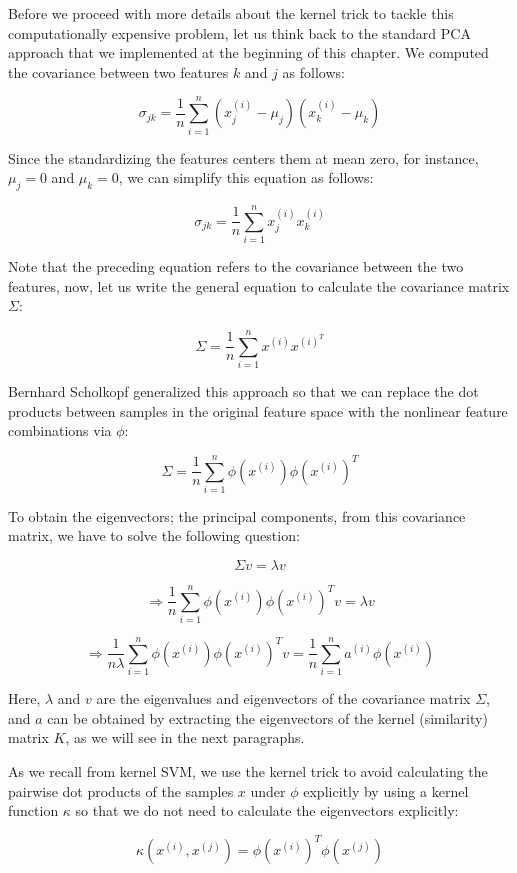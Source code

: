 \documentclass[11pt]{article}
\begin{document}
Before we proceed with more details about the kernel trick to tackle
this computationally expensive problem, let us think back to the
standard PCA approach that we implemented at the beginning of this
chapter. We computed the covariance between two features \(k\) and \(j\)
as follows:

\[\sigma_{jk} = \frac{1}{n} \sum_{i=1}^n \left( x_j^{(i)} - \mu_j \right) \left( x_k^{(i)} - \mu_k \right)\]

Since the standardizing the features centers them at mean zero, for
instance, \(\mu_j = 0\) and \(\mu_k = 0\), we can simplify this equation
as follows:

\[\sigma_{jk} = \frac{1}{n} \sum_{i=1}^n x_j^{(i)} x_k^{(i)}\]

Note that the preceding equation refers to the covariance between the
two features, now, let us write the general equation to calculate the
covariance matrix \(\Sigma\):

\[\Sigma = \frac{1}{n} \sum_{i=1}^n x^{(i)} x^{(i)^T}\]

Bernhard Scholkopf generalized this approach so that we can replace the
dot products between samples in the original feature space with the
nonlinear feature combinations via \(\phi\):

\[\Sigma = \frac{1}{n} \sum_{i=1}^n \phi(x^{(i)}) \phi(x^{(i)})^T\]

To obtain the eigenvectors; the principal components, from this
covariance matrix, we have to solve the following question:

\[\Sigma v = \lambda v\]

\[ \Rightarrow \frac{1}{n} \sum_{i=1}^n \phi(x^{(i)}) \phi(x^{(i)})^T v = \lambda v\]

\[ \Rightarrow \frac{1}{n\lambda} \sum_{i=1}^n \phi(x^{(i)}) \phi(x^{(i)})^T v = \frac{1}{n} \sum_{i=1}^n a^{(i)} \phi(x^{(i)})\]

Here, \(\lambda\) and \(v\) are the eigenvalues and eigenvectors of the
covariance matrix \(\Sigma\), and \(a\) can be obtained by extracting
the eigenvectors of the kernel (similarity) matrix \(K\), as we will see
in the next paragraphs.

As we recall from kernel SVM, we use the kernel trick to avoid
calculating the pairwise dot products of the samples \(x\) under
\(\phi\) explicitly by using a kernel function \(\kappa\) so that we do
not need to calculate the eigenvectors explicitly:

\[\kappa(x^{(i)}, x^{(j)}) = \phi(x^{(i)})^T \phi(x^{(j)})\]
\end{document}

